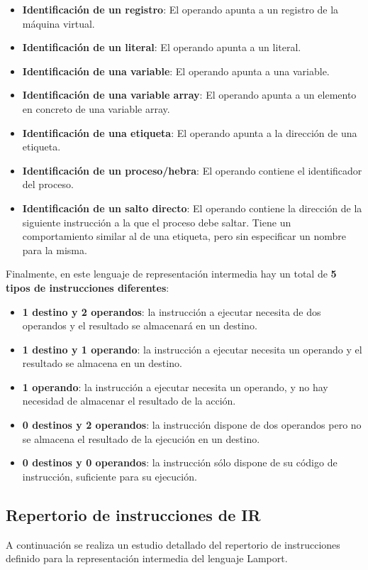 \begin{itemize}
    \item \textbf{Identificación de un registro}: El operando apunta a un registro de la máquina virtual.
    \item \textbf{Identificación de un literal}: El operando apunta a un literal.
    \item \textbf{Identificación de una variable}: El operando apunta a una variable.
    \item \textbf{Identificación de una variable array}: El operando apunta a un elemento en concreto de una variable array.
    \item \textbf{Identificación de una etiqueta}: El operando apunta a la dirección de una etiqueta.
    \item \textbf{Identificación de un proceso/hebra}: El operando contiene el identificador del proceso.
    \item \textbf{Identificación de un salto directo}: El operando contiene la dirección de la siguiente instrucción a la que el proceso debe saltar. Tiene un comportamiento similar al de una etiqueta, pero sin especificar un nombre para la misma.
\end{itemize}

Finalmente, en este lenguaje de representación intermedia hay un total de \textbf{5 tipos de instrucciones diferentes}:

\begin{itemize}
    \item \textbf{1 destino y 2 operandos}: la instrucción a ejecutar necesita de dos operandos y el resultado se almacenará en un destino.
    \item \textbf{1 destino y 1 operando}: la instrucción a ejecutar necesita un operando y el resultado se almacena en un destino.
    \item \textbf{1 operando}: la instrucción a ejecutar necesita un operando, y no hay necesidad de almacenar el resultado de la acción.
    \item \textbf{0 destinos y 2 operandos}: la instrucción dispone de dos operandos pero no se almacena el resultado de la ejecución en un destino.
    \item \textbf{0 destinos y 0 operandos}: la instrucción sólo dispone de su código de instrucción, suficiente para su ejecución.
\end{itemize}

\subsection{Repertorio de instrucciones de IR}
A continuación se realiza un estudio detallado del repertorio de instrucciones definido para la representación intermedia del lenguaje Lamport.

